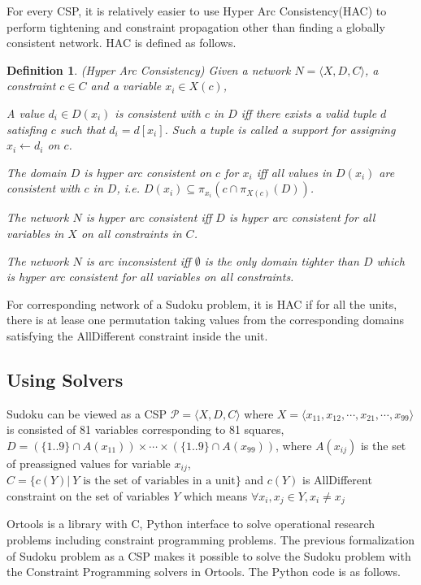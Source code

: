 \documentclass[a4paper, 12pt]{report}
\newtheorem{definition}{Definition}[subsection]
\begin{document}
            For every CSP, it is relatively easier to use Hyper Arc Consistency(HAC) to perform tightening and constraint propagation other than finding a globally consistent network. HAC is defined as follows.
            \begin{definition}
                (Hyper Arc Consistency) Given a network $N=\langle X,D,C\rangle$, a constraint $c\in C$ and a variable $x_i\in X(c)$,

                A value $d_i\in D(x_i)$ is consistent with $c$ in $D$ iff there exists a valid tuple $d$ satisfing $c$ such that $d_i=d[x_i]$. Such a tuple is called a support for assigning $x_i\leftarrow d_i$ on $c$.

                The domain $D$ is hyper arc consistent on $c$ for $x_i$ iff all values in $D(x_i)$ are consistent with $c$ in $D$, i.e. $D(x_i)\subseteq \pi_{x_i} (c\cap \pi_{X(c)} (D))$.

                The network $N$ is hyper arc consistent iff $D$ is hyper arc consistent for all variables in $X$ on all constraints in $C$.

                The network $N$ is arc inconsistent iff $\emptyset$ is the only domain tighter than $D$ which is hyper arc consistent for all variables on all constraints.
            \end{definition}

            For corresponding network of a Sudoku problem, it is HAC if for all the units, there is at lease one permutation taking values from the corresponding domains satisfying the AllDifferent constraint inside the unit.

        \subsection {Using Solvers}
            Sudoku can be viewed as a CSP $\mathcal P=\langle X, D, C\rangle$ where $X=\langle x_{11}, x_{12}, \cdots, x_{21}, \cdots, x_{99}\rangle$ is consisted of 81 variables corresponding to 81 squares, $D=(\{1..9\}\cap A(x_{11}))\times\cdots\times(\{1..9\}\cap A(x_{99}))$, where $A(x_{ij})$ is the set of preassigned values for variable $x_{ij}$,  $C=\{c(Y)|\ Y \text{ is the set of variables in a unit}\}$ and $c(Y)$ is AllDifferent constraint on the set of variables $Y$ which means $\forall x_i,x_j\in Y,
            x_i\neq x_j$

            Ortools is a library with C, Python interface to solve operational research problems including constraint programming problems. The previous formalization of Sudoku problem as a CSP makes it possible to solve the Sudoku problem with the Constraint Programming solvers in Ortools. The Python code is as follows.
\end{document}
